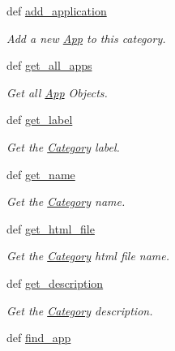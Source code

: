 \begin{CompactItemize}
def \hyperlink{classwinsollib_1_1Category_605babcbeab710db98ced8441d2ba36e}{add\_\-application}
\begin{CompactList}\small\item\em Add a new \hyperlink{classwinsollib_1_1App}{App} to this category. \item\end{CompactList}\item 
def \hyperlink{classwinsollib_1_1Category_c3fa9263851ab098c5b2fcdde42c886c}{get\_\-all\_\-apps}
\begin{CompactList}\small\item\em Get all \hyperlink{classwinsollib_1_1App}{App} Objects. \item\end{CompactList}\item 
def \hyperlink{classwinsollib_1_1Category_98f56ea31cc94280aab1b37f9c0fbc56}{get\_\-label}
\begin{CompactList}\small\item\em Get the \hyperlink{classwinsollib_1_1Category}{Category} label. \item\end{CompactList}\item 
def \hyperlink{classwinsollib_1_1Category_0bb87a7a5079943ef8ed7e207ba87552}{get\_\-name}
\begin{CompactList}\small\item\em Get the \hyperlink{classwinsollib_1_1Category}{Category} name. \item\end{CompactList}\item 
def \hyperlink{classwinsollib_1_1Category_126b7ddf27df79383e2ca4677106af52}{get\_\-html\_\-file}
\begin{CompactList}\small\item\em Get the \hyperlink{classwinsollib_1_1Category}{Category} html file name. \item\end{CompactList}\item 
def \hyperlink{classwinsollib_1_1Category_33630ec616e8ba009d82c8ad776d43e4}{get\_\-description}
\begin{CompactList}\small\item\em Get the \hyperlink{classwinsollib_1_1Category}{Category} description. \item\end{CompactList}\item 
def \hyperlink{classwinsollib_1_1Category_27cf4c87fcebe53192063f504b20bd21}{find\_\-app}

\end{CompactItemize}
